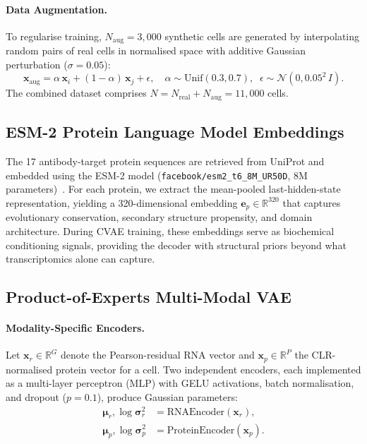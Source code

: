 \documentclass[11pt,a4paper]{article}
\newcommand{\RR}{\mathbb{R}}
\newcommand{\bx}{\mathbf{x}}
\newcommand{\bmu}{\boldsymbol{\mu}}
\newcommand{\bsig}{\boldsymbol{\sigma}}
\begin{document}
\paragraph{Data Augmentation.}
To regularise training, $N_{\text{aug}}=3{,}000$ synthetic cells are generated by interpolating random pairs of real cells in normalised space with additive Gaussian perturbation ($\sigma=0.05$):
\begin{equation}
  \bx_{\text{aug}} = \alpha\,\bx_i + (1{-}\alpha)\,\bx_j + \epsilon, \quad
  \alpha\sim\text{Unif}(0.3,0.7), \;\; \epsilon\sim\mathcal{N}(0, 0.05^2\,I).
\end{equation}
The combined dataset comprises $N = N_{\text{real}} + N_{\text{aug}} = 11{,}000$ cells.

\subsection{ESM-2 Protein Language Model Embeddings}\label{ssec:esm2}

The 17 antibody-target protein sequences are retrieved from UniProt and embedded using the ESM-2 model (\texttt{facebook/esm2\_t6\_8M\_UR50D}, 8M parameters)~\citep{esm2022}.
For each protein, we extract the mean-pooled last-hidden-state representation, yielding a 320-dimensional embedding $\mathbf{e}_p \in \RR^{320}$ that captures evolutionary conservation, secondary structure propensity, and domain architecture.
During CVAE training, these embeddings serve as biochemical conditioning signals, providing the decoder with structural priors beyond what transcriptomics alone can capture.

\subsection{Product-of-Experts Multi-Modal VAE}\label{ssec:mvae}

\paragraph{Modality-Specific Encoders.}
Let $\bx_r \in \RR^G$ denote the Pearson-residual RNA vector and $\bx_p \in \RR^P$ the CLR-normalised protein vector for a cell.
Two independent encoders, each implemented as a multi-layer perceptron (MLP) with GELU activations, batch normalisation, and dropout ($p=0.1$), produce Gaussian parameters:
\begin{align}
  \bmu_r, \log\bsig_r^2 &= \text{RNAEncoder}(\bx_r), \label{eq:enc_rna}\\
  \bmu_p, \log\bsig_p^2 &= \text{ProteinEncoder}(\bx_p). \label{eq:enc_prot}
\end{align}
\end{document}
